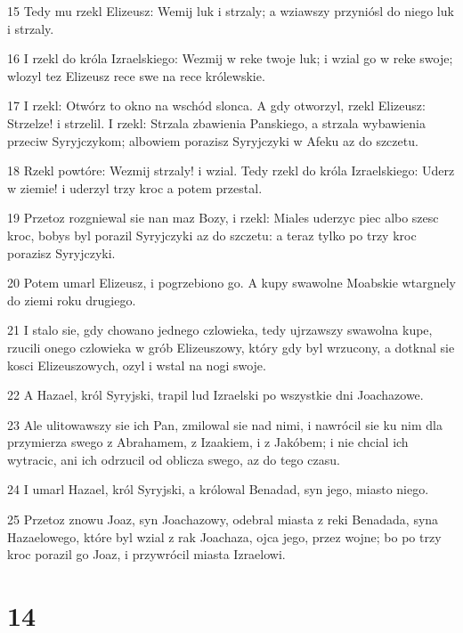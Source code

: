 \par 15 Tedy mu rzekl Elizeusz: Wemij luk i strzaly; a wziawszy przyniósl do niego luk i strzaly.
\par 16 I rzekl do króla Izraelskiego: Wezmij w reke twoje luk; i wzial go w reke swoje; wlozyl tez Elizeusz rece swe na rece królewskie.
\par 17 I rzekl: Otwórz to okno na wschód slonca. A gdy otworzyl, rzekl Elizeusz: Strzelze! i strzelil. I rzekl: Strzala zbawienia Panskiego, a strzala wybawienia przeciw Syryjczykom; albowiem porazisz Syryjczyki w Afeku az do szczetu.
\par 18 Rzekl powtóre: Wezmij strzaly! i wzial. Tedy rzekl do króla Izraelskiego: Uderz w ziemie! i uderzyl trzy kroc a potem przestal.
\par 19 Przetoz rozgniewal sie nan maz Bozy, i rzekl: Miales uderzyc piec albo szesc kroc, bobys byl porazil Syryjczyki az do szczetu: a teraz tylko po trzy kroc porazisz Syryjczyki.
\par 20 Potem umarl Elizeusz, i pogrzebiono go. A kupy swawolne Moabskie wtargnely do ziemi roku drugiego.
\par 21 I stalo sie, gdy chowano jednego czlowieka, tedy ujrzawszy swawolna kupe, rzucili onego czlowieka w grób Elizeuszowy, który gdy byl wrzucony, a dotknal sie kosci Elizeuszowych, ozyl i wstal na nogi swoje.
\par 22 A Hazael, król Syryjski, trapil lud Izraelski po wszystkie dni Joachazowe.
\par 23 Ale ulitowawszy sie ich Pan, zmilowal sie nad nimi, i nawrócil sie ku nim dla przymierza swego z Abrahamem, z Izaakiem, i z Jakóbem; i nie chcial ich wytracic, ani ich odrzucil od oblicza swego, az do tego czasu.
\par 24 I umarl Hazael, król Syryjski, a królowal Benadad, syn jego, miasto niego.
\par 25 Przetoz znowu Joaz, syn Joachazowy, odebral miasta z reki Benadada, syna Hazaelowego, które byl wzial z rak Joachaza, ojca jego, przez wojne; bo po trzy kroc porazil go Joaz, i przywrócil miasta Izraelowi.

\chapter{14}

